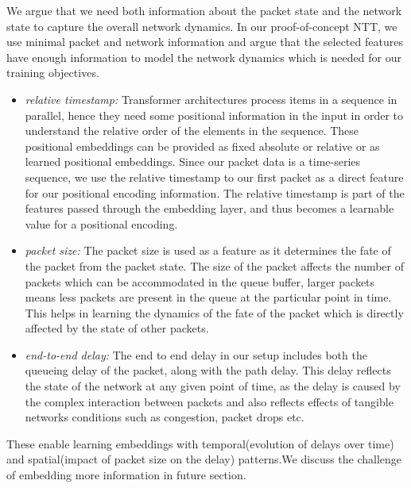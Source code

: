 We argue that we need both information about the packet state and the network state to capture the overall network dynamics. In our proof-of-concept NTT, we use minimal packet and network
information and argue that the selected features have enough information to model the network dynamics which is needed for our training objectives.
\begin{itemize}
\item \emph{relative timestamp:} Transformer architectures process items in a sequence in parallel, hence they need some positional information in the input in order to understand the relative order of the elements in the sequence. These positional embeddings can be provided as fixed absolute\cite{vaswaniAttentionAllYou2017} or relative\cite{shaw2018selfattention} or as learned positional embeddings\cite{gehring2017convolutional}. Since our packet data is a time-series sequence, we use the relative timestamp to our first packet as a direct feature for our positional encoding information. The relative timestamp is part of the features passed through the embedding layer, and thus becomes a learnable value for a positional encoding.
\item \emph{packet size:} The packet size is used as a feature as it determines the fate of the packet from the packet state. The size of the packet affects the number of packets which can be accommodated in the queue buffer, \eg larger packets means less packets are present in the queue at the particular point in time. This helps in learning the dynamics of the fate of the packet which is directly affected by the state of other packets.
\item \emph{end-to-end delay:} The end to end delay in our setup includes both the queueing delay of the packet, along with the path delay. This delay reflects the state of the network at any given point of time, as the delay is caused by the complex interaction between packets and also reflects effects of tangible networks conditions such as congestion, packet drops etc.
\end{itemize}
These enable learning embeddings with temporal(evolution of delays over time) and spatial(impact of packet size on the delay) patterns.We discuss the challenge of embedding more information in future section.

